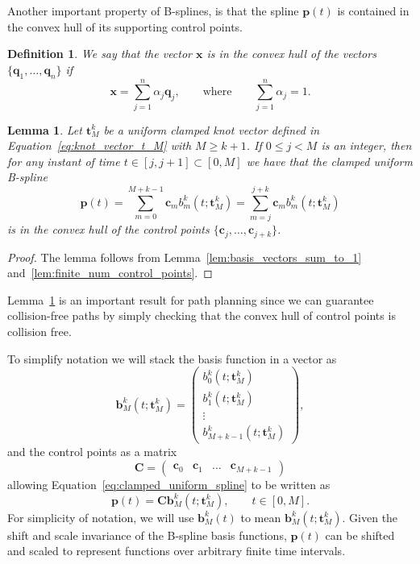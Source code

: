 \documentclass{article}
\newtheorem{lemma}[theorem]{Lemma}
\newtheorem{definition}[theorem]{Definition}
\newcommand{\bbf}{\mathbf{b}}
\newcommand{\cbf}{\mathbf{c}}
\newcommand{\xbf}{\mathbf{x}}
\newcommand{\Cbf}{\mathbf{C}}
\begin{document}
Another important property of B-splines, is that the spline $\mathbf{p}(t)$ is contained in the convex hull of its supporting control points.  
\begin{definition}
We say that the vector $\xbf$ is in the convex hull of the vectors $\{\mathbf{q}_1, \dots, \mathbf{q}_n\}$ if 
\[
\xbf = \sum_{j=1}^n \alpha_j \mathbf{q}_j, \qquad \text{where} \qquad \sum_{j=1}^n \alpha_j = 1.
\]	
\end{definition}

\begin{lemma}\label{lem:spline_in_convex_hull}
	Let $\mathbf{t}_M^k$ be a uniform clamped knot vector defined in Equation~\eqref{eq:knot_vector_t_M} with $M\geq k+1$. If $0\leq j < M$ is an integer, then for any instant of time $t\in[j, j+1]\subset [0, M]$ we have that the clamped uniform B-spline
	\[
	\mathbf{p}(t) = \sum_{m=0}^{M+k-1} \cbf_m b_m^k(t; \mathbf{t}_M^k) = \sum_{m=j}^{j+k} \cbf_m b_m^k(t; \mathbf{t}_M^k)
	\]
	is in the convex hull of the control points $\{\cbf_j, \dots, \cbf_{j+k}\}$.
\end{lemma}
\begin{proof}
	The lemma follows from Lemma~\ref{lem:basis_vectors_sum_to_1} and~\ref{lem:finite_num_control_points}.
\end{proof}
Lemma~\ref{lem:spline_in_convex_hull} is an important result for path planning since we can guarantee collision-free paths by simply checking that the convex hull of control points is collision free.


To simplify notation we will stack the basis function in a vector as
\begin{equation}\label{eq:basis_vector}
\bbf_M^k(t;\mathbf{t}_M^k) = \begin{pmatrix} b_0^k(t;\mathbf{t}_M^k) \\ b_1^k(t;\mathbf{t}_M^k) \\ \vdots \\ b_{M+k-1}^k(t;\mathbf{t}_M^k) \end{pmatrix}, 
\end{equation}
and the control points as a matrix 
\[
\Cbf = \begin{pmatrix} \cbf_0 & \cbf_1 & \dots & \cbf_{M+k-1} \end{pmatrix}
\]
allowing Equation~\eqref{eq:clamped_uniform_spline} to be written as
\[
\mathbf{p}(t) = \Cbf \bbf_M^k(t; \mathbf{t}_M^k), \qquad t\in[0, M].
\]
For simplicity of notation, we will use $\bbf_M^k(t)$ to mean $\bbf_M^k(t; \mathbf{t}_M^k)$.  Given the shift and scale invariance of the B-spline basis functions, $\mathbf{p}(t)$ can be shifted and scaled to represent functions over arbitrary finite time intervals.
\end{document}
